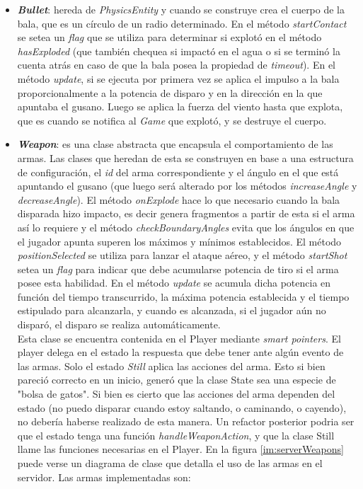 \begin{itemize}
	\item \textbf{\textit{Bullet}}: hereda de \textit{PhysicsEntity} y cuando se construye crea el cuerpo de la bala, que es un círculo de un radio determinado. En el método \textit{startContact} se setea un \textit{flag} que se utiliza para determinar si explotó en el método \textit{hasExploded} (que también chequea si impactó en el agua o si se terminó la cuenta atrás en caso de que la bala posea la propiedad de \textit{timeout}). En el método \textit{update}, si se ejecuta por primera vez se aplica el impulso a la bala proporcionalmente a la potencia de disparo y en la dirección en la que apuntaba el gusano. Luego se aplica la fuerza del viento hasta que explota, que es cuando se notifica al \textit{Game} que explotó, y se destruye el cuerpo.

	\item \textbf{\textit{Weapon}}: es una clase abstracta que encapsula el comportamiento de las armas. Las clases que heredan de esta se construyen en base a una estructura de configuración, el \textit{id} del arma correspondiente y el ángulo en el que está apuntando el gusano (que luego será alterado por los métodos \textit{increaseAngle} y \textit{decreaseAngle}). El método \textit{onExplode} hace lo que necesario cuando la bala disparada hizo impacto, es decir genera fragmentos a partir de esta si el arma así lo requiere y el método \textit{checkBoundaryAngles} evita que los ángulos en que el jugador apunta superen los máximos y mínimos establecidos. El método \textit{positionSelected} se utiliza para lanzar el ataque aéreo, y el método \textit{startShot} setea un \textit{flag} para indicar que debe acumularse potencia de tiro si el arma posee esta habilidad. En el método \textit{update} se acumula dicha potencia en función del tiempo transcurrido, la máxima potencia establecida y el tiempo estipulado para alcanzarla, y cuando es alcanzada, si el jugador aún no disparó, el disparo se realiza automáticamente.\\
	Esta clase se encuentra contenida en el Player mediante \emph{smart pointers}. El player delega en el estado la respuesta que debe tener ante algún evento de las armas. Solo el estado \emph{Still} aplica las acciones del arma. Esto si bien pareció correcto en un inicio, generó que la clase State sea una especie de "bolsa de gatos". Si bien es cierto que las acciones del arma dependen del estado (no puedo disparar cuando estoy saltando, o caminando, o cayendo), no debería haberse realizado de esta manera. Un refactor posterior podria ser que el estado tenga una función \emph{handleWeaponAction}, y que la clase Still llame las funciones necesarias en el Player. En la figura \ref{im:serverWeapons} puede verse un diagrama de clase que detalla el uso de las armas en el servidor. Las armas implementadas son:


\end{itemize}
